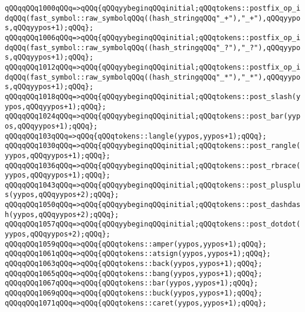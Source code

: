 \newline
\verb|qQQqqQQq1000qQQq=>qQQq{qQQqyybeginqQQqinitial;qQQqtokens::postfix_op_idqQQq(fast_symbol::raw_symbolqQQq((hash_stringqQQq"_+"),"_+"),qQQqyypos,qQQqyypos+1);qQQq};|\newline
\verb|qQQqqQQq1006qQQq=>qQQq{qQQqyybeginqQQqinitial;qQQqtokens::postfix_op_idqQQq(fast_symbol::raw_symbolqQQq((hash_stringqQQq"_?"),"_?"),qQQqyypos,qQQqyypos+1);qQQq};|\newline
\verb|qQQqqQQq1012qQQq=>qQQq{qQQqyybeginqQQqinitial;qQQqtokens::postfix_op_idqQQq(fast_symbol::raw_symbolqQQq((hash_stringqQQq"_*"),"_*"),qQQqyypos,qQQqyypos+1);qQQq};|\newline
\verb|qQQqqQQq1018qQQq=>qQQq{qQQqyybeginqQQqinitial;qQQqtokens::post_slash(yypos,qQQqyypos+1);qQQq};|\newline
\verb|qQQqqQQq1024qQQq=>qQQq{qQQqyybeginqQQqinitial;qQQqtokens::post_bar(yypos,qQQqyypos+1);qQQq};|\newline
\verb|qQQqqQQq103qQQq=>qQQq{qQQqtokens::langle(yypos,yypos+1);qQQq};|\newline
\verb|qQQqqQQq1030qQQq=>qQQq{qQQqyybeginqQQqinitial;qQQqtokens::post_rangle(yypos,qQQqyypos+1);qQQq};|\newline
\verb|qQQqqQQq1036qQQq=>qQQq{qQQqyybeginqQQqinitial;qQQqtokens::post_rbrace(yypos,qQQqyypos+1);qQQq};|\newline
\verb|qQQqqQQq1043qQQq=>qQQq{qQQqyybeginqQQqinitial;qQQqtokens::post_plusplus(yypos,qQQqyypos+2);qQQq};|\newline
\verb|qQQqqQQq1050qQQq=>qQQq{qQQqyybeginqQQqinitial;qQQqtokens::post_dashdash(yypos,qQQqyypos+2);qQQq};|\newline
\verb|qQQqqQQq1057qQQq=>qQQq{qQQqyybeginqQQqinitial;qQQqtokens::post_dotdot(yypos,qQQqyypos+2);qQQq};|\newline
\verb|qQQqqQQq1059qQQq=>qQQq{qQQqtokens::amper(yypos,yypos+1);qQQq};|\newline
\verb|qQQqqQQq1061qQQq=>qQQq{qQQqtokens::atsign(yypos,yypos+1);qQQq};|\newline
\verb|qQQqqQQq1063qQQq=>qQQq{qQQqtokens::back(yypos,yypos+1);qQQq};|\newline
\verb|qQQqqQQq1065qQQq=>qQQq{qQQqtokens::bang(yypos,yypos+1);qQQq};|\newline
\verb|qQQqqQQq1067qQQq=>qQQq{qQQqtokens::bar(yypos,yypos+1);qQQq};|\newline
\verb|qQQqqQQq1069qQQq=>qQQq{qQQqtokens::buck(yypos,yypos+1);qQQq};|\newline
\verb|qQQqqQQq1071qQQq=>qQQq{qQQqtokens::caret(yypos,yypos+1);qQQq};|\newline
